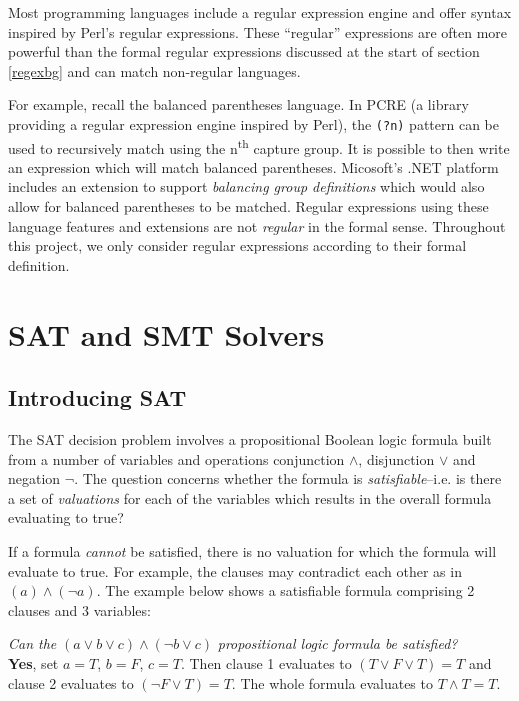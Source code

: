 \documentclass[a4paper,openany,12pt]{book}
\begin{document}
Most programming languages include a regular expression engine and offer syntax inspired by Perl's regular expressions.
These ``regular'' expressions are often more powerful than the formal regular expressions discussed at the start of
section \ref{regexbg} and can match non-regular languages.

For example, recall the balanced parentheses language.
In PCRE (a library providing a regular expression engine inspired by Perl), the \texttt{(?n)} pattern can be used to
recursively match using the n\textsuperscript{th} capture group.
It is possible to then write an expression which will match balanced parentheses.
Micosoft's .NET platform includes an extension to support \emph{balancing group definitions} which would also allow for
balanced parentheses to be matched.
Regular expressions using these language features and extensions are not \emph{regular} in the formal sense.
Throughout this project, we only consider regular expressions according to their formal definition.

\section{SAT and SMT Solvers}

\subsection{Introducing SAT}

The SAT decision problem involves a propositional Boolean logic formula built from a number of variables and operations
conjunction $\land$, disjunction $\lor$ and negation $\neg$.
The question concerns whether the formula is \emph{satisfiable}--i.e. is there a set of \emph{valuations} for each of
the variables which results in the overall formula evaluating to true?

If a formula \emph{cannot} be satisfied, there is no valuation for which the formula will evaluate to true.
For example, the clauses may contradict each other as in $(a) \land (\neg a)$.
The example below shows a satisfiable formula comprising 2 clauses and 3 variables:

\emph{Can the} \(
    (a \lor b \lor c) \land (\neg b \lor c)
\) \emph{propositional logic formula be satisfied?}\\

\textcolor{id7-emerald-green}{\textbf{Yes}}, set $a = T$, $b=F$, $c=T$.
Then clause 1 evaluates to $(T \lor F \lor T) = T$ and clause 2 evaluates to $(\neg F \lor T) = T$.
The whole formula evaluates to $T \land T = T$.
\end{document}
